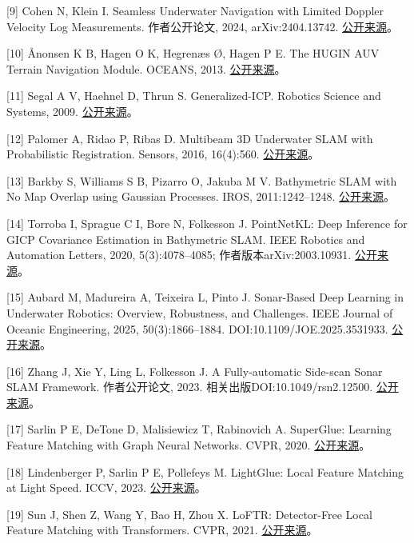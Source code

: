 {[}9{]} Cohen N, Klein I. Seamless Underwater Navigation with Limited Doppler Velocity Log Measurements. 作者公开论文, 2024, arXiv:2404.13742. \href{https://arxiv.org/abs/2404.13742}{公开来源}。

{[}10{]} Ånonsen K B, Hagen O K, Hegrenæs Ø, Hagen P E. The HUGIN AUV Terrain Navigation Module. OCEANS, 2013. \href{https://www.navlab.net/Publications/The_HUGIN_AUV_Terrain_Navigation_Module.pdf}{公开来源}。

{[}11{]} Segal A V, Haehnel D, Thrun S. Generalized-ICP. Robotics Science and Systems, 2009. \href{https://www.robots.ox.ac.uk/~avsegal/resources/papers/Generalized_ICP.pdf}{公开来源}。

{[}12{]} Palomer A, Ridao P, Ribas D. Multibeam 3D Underwater SLAM with Probabilistic Registration. Sensors, 2016, 16(4):560. \href{https://pmc.ncbi.nlm.nih.gov/articles/PMC4851074/}{公开来源}。

{[}13{]} Barkby S, Williams S B, Pizarro O, Jakuba M V. Bathymetric SLAM with No Map Overlap using Gaussian Processes. IROS, 2011:1242--1248. \href{https://www-personal.acfr.usyd.edu.au/sbarkby/2011_iros_bpslam.pdf}{公开来源}。

{[}14{]} Torroba I, Sprague C I, Bore N, Folkesson J. PointNetKL: Deep Inference for GICP Covariance Estimation in Bathymetric SLAM. IEEE Robotics and Automation Letters, 2020, 5(3):4078--4085; 作者版本arXiv:2003.10931. \href{https://arxiv.org/abs/2003.10931}{公开来源}。

{[}15{]} Aubard M, Madureira A, Teixeira L, Pinto J. Sonar-Based Deep Learning in Underwater Robotics: Overview, Robustness, and Challenges. IEEE Journal of Oceanic Engineering, 2025, 50(3):1866--1884. DOI:10.1109/JOE.2025.3531933. \href{https://arxiv.org/abs/2412.11840}{公开来源}。

{[}16{]} Zhang J, Xie Y, Ling L, Folkesson J. A Fully-automatic Side-scan Sonar SLAM Framework. 作者公开论文, 2023. 相关出版DOI:10.1049/rsn2.12500. \href{https://arxiv.org/abs/2304.01854}{公开来源}。

{[}17{]} Sarlin P E, DeTone D, Malisiewicz T, Rabinovich A. SuperGlue: Learning Feature Matching with Graph Neural Networks. CVPR, 2020. \href{https://arxiv.org/abs/1911.11763}{公开来源}。

{[}18{]} Lindenberger P, Sarlin P E, Pollefeys M. LightGlue: Local Feature Matching at Light Speed. ICCV, 2023. \href{https://arxiv.org/abs/2306.13643}{公开来源}。

{[}19{]} Sun J, Shen Z, Wang Y, Bao H, Zhou X. LoFTR: Detector-Free Local Feature Matching with Transformers. CVPR, 2021. \href{https://arxiv.org/abs/2104.00680}{公开来源}。

